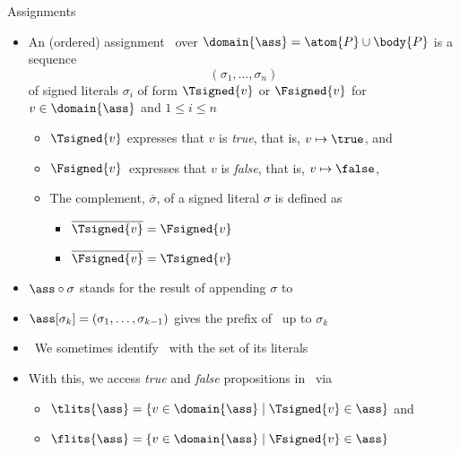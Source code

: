 \begin{frame}{Assignments}
  \begin{itemize}
  \item<2-> An (ordered) \alert{assignment} \ass\ over $\domain{\ass}=\atom{P}\cup\body{P}$
    is a sequence
    \[
    (\sigma_1,\ldots,\sigma_n)
    \]
    of \alert{signed literals}
    $\sigma_i$ of form \alert{$\Tsigned{v}$} or \alert{$\Fsigned{v}$} for
    $v\in\domain{\ass}$ and $1 \leq i \leq n$
    \medskip
    \begin{itemize}\normalsize
    \item<only@3-4> $\Tsigned{v}$   expresses that $v$ is \emph{true},\; that is, $v\mapsto\true$, and
    \item<only@3-4> $\Fsigned{v}$\, expresses that $v$ is \emph{false}, that is, $v\mapsto\false$,
      \medskip
    \item<only@4  > The complement, $\overline{\sigma}$, of a signed literal $\sigma$ is defined as
      \begin{itemize}\normalsize
      \item $\overline{\Tsigned{v}} = \Fsigned{v}$
      \item $\overline{\Fsigned{v}} = \Tsigned{v}$
      \end{itemize}
    \end{itemize}
  \item<only@6-> $\ass\circ\sigma$ stands for the result of appending $\sigma$ to \ass
  \item<only@6-> $\ass[\sigma_k]=(\sigma_1,\ldots,\sigma_{k-1})$ gives the prefix of \ass\ up to $\sigma_k$
    \medskip
  \item<only@7>  \ We sometimes identify \ass\ with the set of its literals
    \smallskip
  \item<only@7>
    With this,
    we access \emph{true} and \emph{false} propositions in \ass\ via
    \begin{itemize}\normalsize
    \item \( \tlits{\ass} = \{v \in \domain{\ass} \mid \Tsigned{v} \in\ass\} \) and
    \item \( \flits{\ass} = \{v \in \domain{\ass} \mid \Fsigned{v} \in\ass\} \)
    \end{itemize}
  \end{itemize}
\end{frame}
